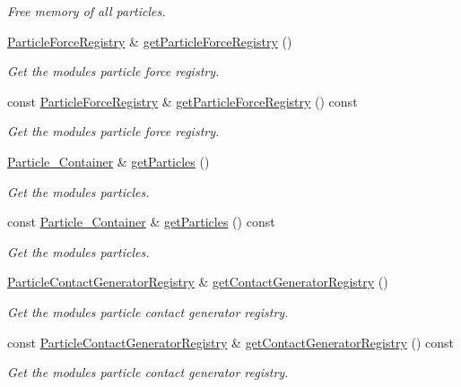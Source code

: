 \begin{DoxyCompactItemize}
\begin{DoxyCompactList}\small\item\em Free memory of all particles. \end{DoxyCompactList}\item 
\mbox{\hyperlink{classr3_1_1_particle_force_registry}{Particle\+Force\+Registry}} \& \mbox{\hyperlink{classr3_1_1_particle_world_aaa3f952fdfd8862673d41afa078245bf}{get\+Particle\+Force\+Registry}} ()
\begin{DoxyCompactList}\small\item\em Get the module\textquotesingle{}s particle force registry. \end{DoxyCompactList}\item 
const \mbox{\hyperlink{classr3_1_1_particle_force_registry}{Particle\+Force\+Registry}} \& \mbox{\hyperlink{classr3_1_1_particle_world_add0e006264e25065ff226eafc0c1a29d}{get\+Particle\+Force\+Registry}} () const
\begin{DoxyCompactList}\small\item\em Get the module\textquotesingle{}s particle force registry. \end{DoxyCompactList}\item 
\mbox{\hyperlink{classr3_1_1_particle_world_aa354f6786c0837674fe8286f00465631}{Particle\+\_\+\+Container}} \& \mbox{\hyperlink{classr3_1_1_particle_world_a00a5014002f28e35ebb59a3f8175db3c}{get\+Particles}} ()
\begin{DoxyCompactList}\small\item\em Get the module\textquotesingle{}s particles. \end{DoxyCompactList}\item 
const \mbox{\hyperlink{classr3_1_1_particle_world_aa354f6786c0837674fe8286f00465631}{Particle\+\_\+\+Container}} \& \mbox{\hyperlink{classr3_1_1_particle_world_ab816d6bca8b42fdf16170275087008f0}{get\+Particles}} () const
\begin{DoxyCompactList}\small\item\em Get the module\textquotesingle{}s particles. \end{DoxyCompactList}\item 
\mbox{\hyperlink{classr3_1_1_particle_contact_generator_registry}{Particle\+Contact\+Generator\+Registry}} \& \mbox{\hyperlink{classr3_1_1_particle_world_a85fc9fcf5c51a5bbce206a35a82f8ccf}{get\+Contact\+Generator\+Registry}} ()
\begin{DoxyCompactList}\small\item\em Get the module\textquotesingle{}s particle contact generator registry. \end{DoxyCompactList}\item 
const \mbox{\hyperlink{classr3_1_1_particle_contact_generator_registry}{Particle\+Contact\+Generator\+Registry}} \& \mbox{\hyperlink{classr3_1_1_particle_world_ab5cd3adaed73294927de72f3293b0709}{get\+Contact\+Generator\+Registry}} () const
\begin{DoxyCompactList}\small\item\em Get the module\textquotesingle{}s particle contact generator registry. \end{DoxyCompactList}\end{DoxyCompactItemize}
